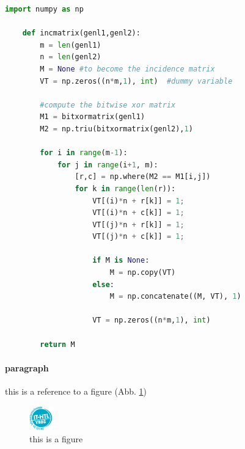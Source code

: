 \documentclass[11pt,a4paper]{article}
\begin{document}
    \begin{lstlisting}[language=Python, caption=Python example, label=example]
    import numpy as np

    def incmatrix(genl1,genl2):
        m = len(genl1)
        n = len(genl2)
        M = None #to become the incidence matrix
        VT = np.zeros((n*m,1), int)  #dummy variable

        #compute the bitwise xor matrix
        M1 = bitxormatrix(genl1)
        M2 = np.triu(bitxormatrix(genl2),1)

        for i in range(m-1):
            for j in range(i+1, m):
                [r,c] = np.where(M2 == M1[i,j])
                for k in range(len(r)):
                    VT[(i)*n + r[k]] = 1;
                    VT[(i)*n + c[k]] = 1;
                    VT[(j)*n + r[k]] = 1;
                    VT[(j)*n + c[k]] = 1;

                    if M is None:
                        M = np.copy(VT)
                    else:
                        M = np.concatenate((M, VT), 1)

                    VT = np.zeros((n*m,1), int)

        return M
    \end{lstlisting}


    \paragraph{paragraph}
    this is a reference to a figure (Abb. \ref{fig:demo-figure})

    \begin{figure}[h]
        \centering
        \includegraphics[width=1cm]{LogoITHTL_white.png}
        \caption{this is a figure}
        \label{fig:demo-figure}
    \end{figure}
\end{document}
